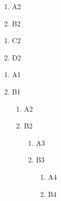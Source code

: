 ﻿\documentclass{article}
\begin{document}
    \dotfill

    \begin{enumerate}
        \item A2
        \item B2
    \end{enumerate}

    \begin{enumerate}[resume]
        \item C2
        \item D2
    \end{enumerate}
    
\hrulefill%

    {
    \begin{enumerate}
        \item A1
        \item B1
        \begin{enumerate}
            \item A2
            \item B2
            \begin{enumerate}
                \item A3
                \item B3
                \begin{enumerate}
                    \item A4
                    \item B4
                \end{enumerate}
            \end{enumerate}
        \end{enumerate}
    \end{enumerate}
    } %
\end{document}
